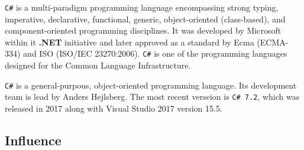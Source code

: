 \documentclass[../Languages.tex]{subfiles}
\begin{document}
\label{sec:c_}

\texttt{C\#} is a multi-paradigm programming language encompassing strong
typing, imperative, declarative, functional, generic, object-oriented
(class-based), and component-oriented programming disciplines. It was developed
by Microsoft within it \textbf{.NET} initiative and later approved as a
standard by Ecma (ECMA-334) and ISO (ISO/IEC 23270:2006). \texttt{C\#} is one
of the programming languages designed for the Common Language Infrastructure.

\texttt{C\#} is a general-purpous, object-oriented programming language. Its
development team is lead by Anders Hejlsberg. The most recent verseion is
\texttt{C\# 7.2}, which was released in 2017 along with Visual Studio 2017
version 15.5.

\subsection{Influence}\label{sub:influence}
\end{document}

